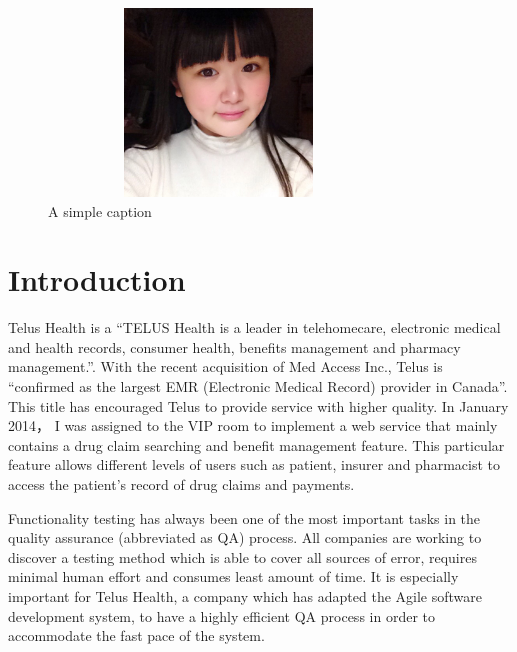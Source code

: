 \documentclass[12pt]{article}
\begin{document}
\begin{figure}[ht!]
\centering
\includegraphics[width=90mm,height=5cm,keepaspectratio]{img/aaa.jpg}
\caption{A simple caption}
\label{overflow}
\end{figure}


\newpage

\toc


\section{Introduction}

Telus Health is a “TELUS Health is a leader in telehomecare, electronic medical and health records, consumer health, benefits management and pharmacy management.”\cite{telusComp}. With the recent acquisition of Med Access Inc., Telus is “confirmed as the largest EMR (Electronic Medical Record) provider in Canada”\cite{telusComp}. This title has encouraged Telus to provide service with higher quality. In January 2014， I was assigned to the VIP room to implement a web service that mainly contains a drug claim searching and benefit management feature. This particular feature allows different levels of users such as patient, insurer and pharmacist to access the patient's record of drug claims and payments.

Functionality testing has always been one of the most important tasks in the quality assurance (abbreviated as QA) process. All companies are working to discover a testing method which is able to cover all sources of error, requires minimal human effort and consumes least amount of time. It is especially important for Telus Health, a company which has adapted the Agile software development system, to have a highly efficient QA process in order to accommodate the fast pace of the system.\\
\end{document}
